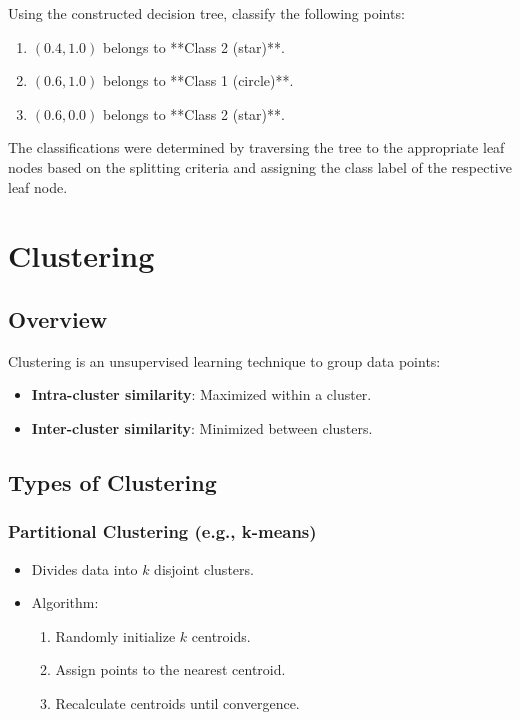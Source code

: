 \documentclass{article}
\begin{document}
Using the constructed decision tree, classify the following points:

\begin{enumerate}
    \item \((0.4, 1.0)\) belongs to **Class 2 (star)**.
    \item \((0.6, 1.0)\) belongs to **Class 1 (circle)**.
    \item \((0.6, 0.0)\) belongs to **Class 2 (star)**.
\end{enumerate}

The classifications were determined by traversing the tree to the appropriate leaf nodes based on the splitting criteria and assigning the class label of the respective leaf node.

\section{Clustering}

\subsection*{Overview}
Clustering is an unsupervised learning technique to group data points:
\begin{itemize}
    \item \textbf{Intra-cluster similarity}: Maximized within a cluster.
    \item \textbf{Inter-cluster similarity}: Minimized between clusters.
\end{itemize}

\subsection*{Types of Clustering}
\subsubsection*{Partitional Clustering (e.g., k-means)}
\begin{itemize}
    \item Divides data into \(k\) disjoint clusters.
    \item Algorithm:
    \begin{enumerate}
        \item Randomly initialize \(k\) centroids.
        \item Assign points to the nearest centroid.
        \item Recalculate centroids until convergence.
    \end{enumerate}
\end{itemize}
\end{document}
